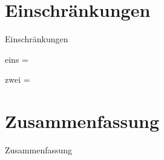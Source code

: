 \documentclass{sdqbeamer}
\begin{document}
\section{Einschränkungen}
\begin{frame}{Einschränkungen}
\begin{redblock}{eins}
= \texttt{}
\end{redblock}
\begin{redblock}{zwei}
= \texttt{}
\end{redblock}
\end{frame}

\section{Zusammenfassung}
\begin{frame}{Zusammenfassung}

\end{frame}
\end{document}
